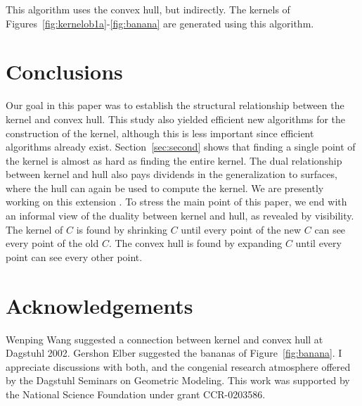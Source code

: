 \documentclass{sig-alternate}
\begin{document}
\noindent This algorithm uses the convex hull, but indirectly.
The kernels of Figures~\ref{fig:kernelob1a}-\ref{fig:banana}
are generated using this algorithm.



\section{Conclusions}
\label{sec:conclude}

Our goal in this paper was to establish the structural relationship between
the kernel and convex hull.
This study also yielded efficient new algorithms for the construction
of the kernel, although this is less important since efficient algorithms already exist.
Section~\ref{sec:second} shows that finding a single point of the kernel 
is almost as hard as finding the entire kernel.
The dual relationship between kernel and hull also pays dividends
in the generalization to surfaces, where the hull can again be used
to compute the kernel.
We are presently working on this extension \cite{jj03}.
To stress the main point of this paper, we end with an 
informal view of the duality between kernel and hull, as revealed by visibility.
The kernel of $C$ is found by shrinking $C$ until every point of the new $C$ 
can see every point of the old $C$.
The convex hull is found by expanding $C$ until every point can see every other point.

\section{Acknowledgements}

Wenping Wang suggested a connection between kernel and convex hull at Dagstuhl 2002.
Gershon Elber suggested the bananas of Figure~\ref{fig:banana}.
I appreciate discussions with both, and the congenial research
atmosphere offered by the Dagstuhl Seminars on Geometric Modeling.
This work was supported by the National Science Foundation under 
grant CCR-0203586.

\end{document}
